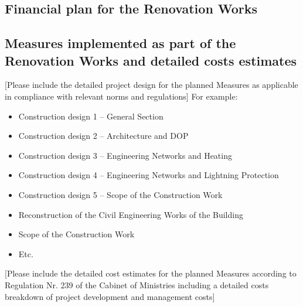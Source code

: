 \subsection{Financial plan for the Renovation Works}


\begin{center}
\end{center}

\subsection{Measures implemented as part of the Renovation Works and detailed costs estimates}

[Please include the detailed project design for the planned Measures as applicable in compliance with relevant norms and regulations]
For example:

\begin{itemize}
	\item Construction design 1 – General Section
	\item Construction design 2 – Architecture and DOP
	\item Construction design 3 – Engineering Networks and Heating
	\item Construction design 4 – Engineering Networks and Lightning Protection
	\item Construction design 5 – Scope of the Construction Work
	\item Reconstruction of the Civil Engineering Works of the Building
	\item Scope of the Construction Work
	\item Etc.
\end{itemize}

[Please include the detailed cost estimates for the planned Measures according to Regulation Nr. 239 of the Cabinet of Ministries including a detailed costs breakdown of project development and management costs]
